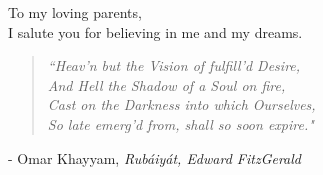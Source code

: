 \thispagestyle{empty}


\vspace*{3cm}
\begin{center}
    To my loving parents, \\ \medskip I salute you for believing in me and my dreams.
\end{center}


\vspace*{3cm}
\begin{center}
\newcommand{\chapquote}[3]{\begin{quotation} \textit{#1} \end{quotation} \begin{flushright} - #2, \textit{#3}\end{flushright} }

\chapquote{``Heav’n but the Vision of fulfill’d Desire,\\
And Hell the Shadow of a Soul on fire,\\
Cast on the Darkness into which Ourselves,\\
So late emerg’d from, shall so soon expire."}{Omar Khayyam}{Rubáiyát, Edward FitzGerald}
\end{center}
